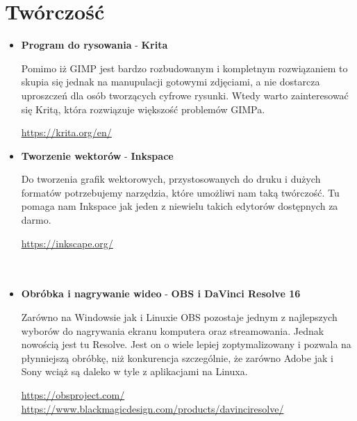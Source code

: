 \documentclass[10pt,a4paper]{report}
\begin{document}
\section{Twórczość}
\begin{itemize}

\item \textbf{Program do rysowania} - \textbf{Krita} \par Pomimo iż GIMP jest bardzo rozbudowanym i kompletnym rozwiązaniem to skupia się jednak na manupulacji gotowymi zdjęciami, a nie dostarcza uproszczeń dla osób tworzących cyfrowe rysunki. Wtedy warto zainteresować się Kritą, która rozwiązuje większość problemów GIMPa. \par \url{https://krita.org/en/}

\item \textbf{Tworzenie wektorów} - \textbf{Inkspace} \par Do tworzenia grafik wektorowych, przystosowanych do druku i dużych formatów potrzebujemy narzędzia, które umożliwi nam taką twórczość. Tu pomaga nam Inkspace jak jeden z niewielu takich edytorów dostępnych za darmo. \par \url{https://inkscape.org/} \\\\\\

\item \textbf{Obróbka i nagrywanie wideo} - \textbf{OBS i  DaVinci Resolve 16} \par Zarówno na Windowsie jak i Linuxie OBS pozostaje jednym z najlepszych wyborów do nagrywania ekranu komputera oraz streamowania. Jednak nowością jest tu Resolve. Jest on o wiele lepiej zoptymalizowany i pozwala na płynniejszą obróbkę, niż konkurencja szczególnie, że zarówno Adobe jak i Sony wciąż są daleko w tyle z aplikacjami na Linuxa. \par \url{https://obsproject.com/} \\ \url{https://www.blackmagicdesign.com/products/davinciresolve/}

\end{itemize}
\end{document}
